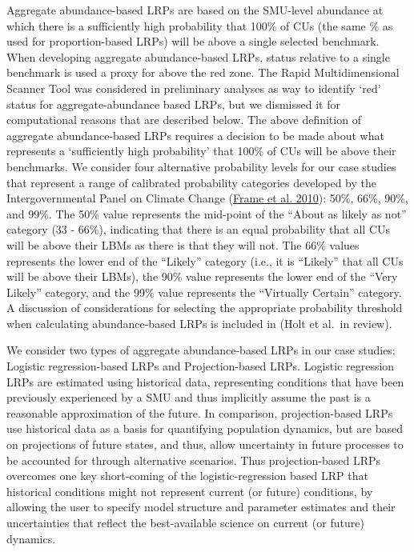 \documentclass[11pt]{book}
\begin{document}
Aggregate abundance-based LRPs are based on the SMU-level abundance at which there is a sufficiently high probability that 100\% of CUs (the same \% as used for proportion-based LRPs) will be above a single selected benchmark. When developing aggregate abundance-based LRPs, status relative to a single benchmark is used a proxy for above the red zone. The Rapid Multidimensional Scanner Tool was considered in preliminary analyses as way to identify `red' status for aggregate-abundance based LRPs, but we dismissed it for computational reasons that are described below. The above definition of aggregate abundance-based LRPs requires a decision to be made about what represents a `sufficiently high probability' that 100\% of CUs will be above their benchmarks. We consider four alternative probability levels for our case studies that represent a range of calibrated probability categories developed by the Intergovernmental Panel on Climate Change (\protect\hyperlink{ref-frameGuidanceNoteLead2010}{Frame et al. 2010}): 50\%, 66\%, 90\%, and 99\%. The 50\% value represents the mid-point of the ``About as likely as not'' category (33 - 66\%), indicating that there is an equal probability that all CUs will be above their LBMs as there is that they will not. The 66\% values represents the lower end of the ``Likely'' category (i.e., it is ``Likely'' that all CUs will be above their LBMs), the 90\% value represents the lower end of the ``Very Likely'' category, and the 99\% value represents the ``Virtually Certain'' category. A discussion of considerations for selecting the appropriate probability threshold when calculating abundance-based LRPs is included in (Holt et al.~in review).

We consider two types of aggregate abundance-based LRPs in our case studies: Logistic regression-based LRPs and Projection-based LRPs. Logistic regression LRPs are estimated using historical data, representing conditions that have been previously experienced by a SMU and thus implicitly assume the past is a reasonable approximation of the future. In comparison, projection-based LRPs use historical data as a basis for quantifying population dynamics, but are based on projections of future states, and thus, allow uncertainty in future processes to be accounted for through alternative scenarios. Thus projection-based LRPs overcomes one key short-coming of the logistic-regression based LRP that historical conditions might not represent current (or future) conditions, by allowing the user to specify model structure and parameter estimates and their uncertainties that reflect the best-available science on current (or future) dynamics.
\end{document}
